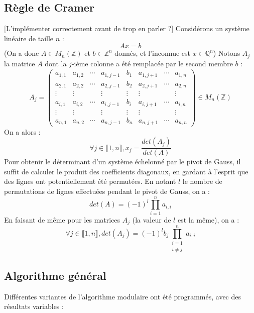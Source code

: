 \documentclass[french]{article}
\begin{document}
\subsection{Règle de Cramer} \label{subsec:cramer}
[L'implémenter correctement avant de trop en parler ?]
\newline
Considérons un système linéaire de taille $n$ :
$$ A x = b$$
(On a donc $A \in M_n(\mathbb{Z})$ et $b \in \mathbb{Z}^n$ donnés, et l'inconnue est $x \in \mathbb{Q}^n$)
\newline
Notons $A_j$ la matrice $A$ dont la $j$-ième colonne a été remplacée par le second membre $b$ :
\begin{equation*}
	A_j = 
	\begin{pmatrix}
		a_{1,1} & a_{1,2} & \cdots & a_{1,j-1} & b_1 & a_{1,j+1} & \cdots & a_{1,n}\\
		a_{2,1} & a_{2,2} & \cdots & a_{2,j-1} & b_2 & a_{2,j+1} & \cdots & a_{2,n}\\
		\vdots  & \vdots  & & \vdots & \vdots & \vdots & & \vdots\\
		a_{i,1} & a_{i,2} & \cdots & a_{i,j-1} & b_i & a_{i,j+1} & \cdots & a_{i,n}\\
		\vdots  & \vdots  & & \vdots & \vdots & \vdots & & \vdots\\
		a_{n,1} & a_{n,2} & \cdots & a_{n,j-1} & b_n & a_{n,j+1} &\cdots & a_{n,n}
	\end{pmatrix}
	\in M_n(\mathbb{Z})
\end{equation*}
On a alors :
$$ \forall j \in \llbracket1,n\rrbracket, x_j = \frac{det(A_j)}{det(A)}$$
\newline
Pour obtenir le déterminant d'un système échelonné par le pivot de Gauss, il suffit de calculer le produit des coefficients diagonaux, en gardant à l'esprit que des lignes ont potentiellement été permutées. En notant $l$ le nombre de permutations de lignes effectuées pendant le pivot de Gauss, on a :
$$ det(A) = (-1)^l\prod_{i = 1}^na_{i,i}$$
En faisant de même pour les matrices $A_j$ (la valeur de $l$ est la même), on a :
$$ \forall j \in \llbracket1,n\rrbracket, det(A_j) = (-1)^l b_j \prod_{\substack{i=1 \\ i\neq j}}^na_{i,i}$$
\subsection{Algorithme général}
Différentes variantes de l'algorithme modulaire ont été programmés, avec des résultats variables :
\end{document}
